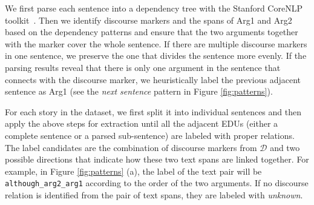 \documentclass[11pt]{article}
\begin{document}
We first parse each sentence into a dependency tree with the Stanford CoreNLP toolkit~\citep{manning-EtAl:2014:P14-5}. Then we identify discourse markers and the spans of Arg1 and Arg2 based on the dependency patterns and ensure that the two arguments together with the marker cover the whole sentence. If there are multiple discourse markers in one sentence, we preserve the one that divides the sentence more evenly.
If the parsing results reveal that there is only one argument in the sentence that connects with the discourse marker, we heuristically label the previous adjacent sentence as Arg1 (see the \textit{next sentence} pattern in Figure \ref{fig:patterns}).

For each story in the dataset, we first split it into individual sentences and then apply the above steps for extraction until all the adjacent EDUs (either a complete sentence or a parsed sub-sentence) are labeled with proper relations. The label candidates are the combination of discourse markers from $\mathcal{D}$ and two possible directions that indicate how these two text spans are linked together. For example, in Figure \ref{fig:patterns} (a), the label of the text pair will be \texttt{although\_arg2\_arg1} according to the order of the two arguments. If no discourse relation is identified from the pair of text spans, they are labeled with \textit{unknown}. 
\end{document}
